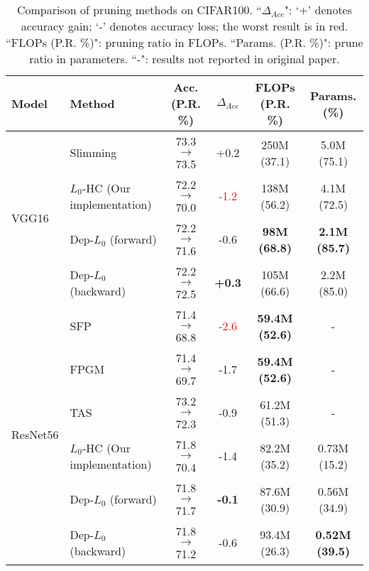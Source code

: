 \documentclass[runningheads, envcountsame, a4paper]{llncs}
\begin{document}
\begin{table*}[ht!]
  \small
  \centering
  \caption{Comparison of pruning methods on CIFAR100. ``$\Delta_{Acc}$": `+' denotes accuracy gain; `-' denotes accuracy loss; the worst result is in red. ``FLOPs (P.R. \%)": pruning ratio in FLOPs. ``Params. (P.R. \%)": prune ratio in parameters. ``-": results not
  reported in original paper.}%
  \begin{tabular}{l l c c c c}\toprule
     Model & Method & Acc. (P.R. \%) & $\Delta_{Acc}$  & FLOPs (P.R. \%) & Params. (\%) \\\hline
      \multirow{4}{*}{VGG16} & Slimming~\cite{liu2017learning} & 73.3$\rightarrow$73.5 & +0.2& 250M (37.1) & 5.0M (75.1) \\
      & \cellcolor{blue!25}$L_0$-HC (Our implementation) & \cellcolor{blue!25}72.2$\rightarrow$70.0 & \cellcolor{blue!25}\textcolor{red}{-1.2} &  \cellcolor{blue!25}138M (56.2) & \cellcolor{blue!25}4.1M (72.5) \\
      & \cellcolor{blue!25}Dep-$L_0$ (forward) & \cellcolor{blue!25}72.2$\rightarrow$71.6 & \cellcolor{blue!25}-0.6 & \cellcolor{blue!25}\textbf{98M (68.8)} & \cellcolor{blue!25}\textbf{2.1M  (85.7) }\\
      & \cellcolor{blue!25}Dep-$L_0$ (backward) & \cellcolor{blue!25}72.2$\rightarrow$72.5 & \cellcolor{blue!25}\textbf{+0.3} &\cellcolor{blue!25}105M (66.6) & \cellcolor{blue!25}2.2M (85.0) \\\hline
      \multirow{6}{*}{ResNet56} & SFP~\cite{he2018soft} & 71.4$\rightarrow$68.8 & \textcolor{red}{-2.6} & \textbf{59.4M (52.6)} & -\\
      & FPGM~\cite{he2019filter} & 71.4$\rightarrow$69.7 & -1.7 & \textbf{59.4M (52.6)} & -\\
      & TAS~\cite{dong2019network} & 73.2$\rightarrow$72.3 & -0.9 & 61.2M (51.3) & -\\
      & \cellcolor{blue!25}$L_0$-HC (Our implementation) & \cellcolor{blue!25}71.8$\rightarrow$70.4 & \cellcolor{blue!25}-1.4  & \cellcolor{blue!25}82.2M (35.2) & \cellcolor{blue!25}0.73M (15.2) \\
      & \cellcolor{blue!25}Dep-$L_0$ (forward) & \cellcolor{blue!25}71.8$\rightarrow$71.7 & \cellcolor{blue!25}\textbf{-0.1} & \cellcolor{blue!25}87.6M (30.9) & \cellcolor{blue!25}0.56M (34.9) \\
      & \cellcolor{blue!25}Dep-$L_0$ (backward) & \cellcolor{blue!25}71.8$\rightarrow$71.2 & \cellcolor{blue!25}-0.6 & \cellcolor{blue!25}93.4M (26.3) & \cellcolor{blue!25}\textbf{0.52M (39.5)} \\
      \bottomrule
  \end{tabular}
  \label{tab:cifar100}
\end{table*}
\end{document}
